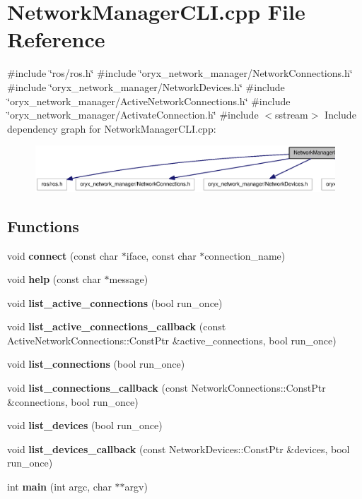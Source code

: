 \section{\-Network\-Manager\-C\-L\-I.\-cpp \-File \-Reference}
\label{NetworkManagerCLI_8cpp}
{\ttfamily \#include \char`\"{}ros/ros.\-h\char`\"{}}\*
{\ttfamily \#include \char`\"{}oryx\-\_\-network\-\_\-manager/\-Network\-Connections.\-h\char`\"{}}\*
{\ttfamily \#include \char`\"{}oryx\-\_\-network\-\_\-manager/\-Network\-Devices.\-h\char`\"{}}\*
{\ttfamily \#include \char`\"{}oryx\-\_\-network\-\_\-manager/\-Active\-Network\-Connections.\-h\char`\"{}}\*
{\ttfamily \#include \char`\"{}oryx\-\_\-network\-\_\-manager/\-Activate\-Connection.\-h\char`\"{}}\*
{\ttfamily \#include $<$sstream$>$}\*
\-Include dependency graph for \-Network\-Manager\-C\-L\-I.\-cpp\-:
\nopagebreak
\begin{figure}[H]
\begin{center}
\leavevmode
\includegraphics[width=350pt]{NetworkManagerCLI_8cpp__incl}
\end{center}
\end{figure}
\subsection*{\-Functions}
\begin{DoxyCompactItemize}
\item 
void {\bf connect} (const char $\ast$iface, const char $\ast$connection\-\_\-name)
\item 
void {\bf help} (const char $\ast$message)
\item 
void {\bf list\-\_\-active\-\_\-connections} (bool run\-\_\-once)
\item 
void {\bf list\-\_\-active\-\_\-connections\-\_\-callback} (const \-Active\-Network\-Connections\-::\-Const\-Ptr \&active\-\_\-connections, bool run\-\_\-once)
\item 
void {\bf list\-\_\-connections} (bool run\-\_\-once)
\item 
void {\bf list\-\_\-connections\-\_\-callback} (const \-Network\-Connections\-::\-Const\-Ptr \&connections, bool run\-\_\-once)
\item 
void {\bf list\-\_\-devices} (bool run\-\_\-once)
\item 
void {\bf list\-\_\-devices\-\_\-callback} (const \-Network\-Devices\-::\-Const\-Ptr \&devices, bool run\-\_\-once)
\item 
int {\bf main} (int argc, char $\ast$$\ast$argv)
\end{DoxyCompactItemize}


